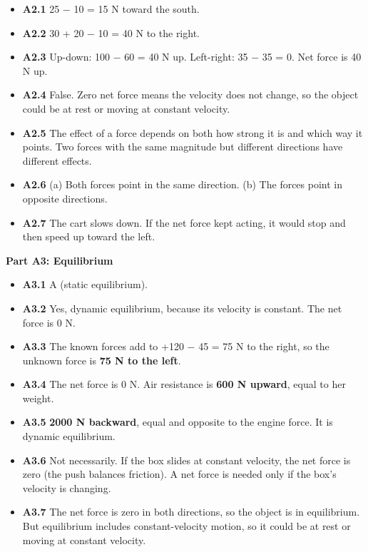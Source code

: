 \documentclass[
]{article}
\providecommand{\tightlist}{%
  \setlength{\itemsep}{0pt}\setlength{\parskip}{0pt}}
\begin{document}
\begin{itemize}
\tightlist
\item
  \textbf{A2.1} 25 − 10 = 15 N toward the south.
\item
  \textbf{A2.2} 30 + 20 − 10 = 40 N to the right.
\item
  \textbf{A2.3} Up-down: 100 − 60 = 40 N up. Left-right: 35 − 35 = 0.
  Net force is 40 N up.
\item
  \textbf{A2.4} False. Zero net force means the velocity does not
  change, so the object could be at rest or moving at constant velocity.
\item
  \textbf{A2.5} The effect of a force depends on both how strong it is
  and which way it points. Two forces with the same magnitude but
  different directions have different effects.
\item
  \textbf{A2.6} (a) Both forces point in the same direction. (b) The
  forces point in opposite directions.
\item
  \textbf{A2.7} The cart slows down. If the net force kept acting, it
  would stop and then speed up toward the left.
\end{itemize}

\textbf{Part A3: Equilibrium}

\begin{itemize}
\tightlist
\item
  \textbf{A3.1} A (static equilibrium).
\item
  \textbf{A3.2} Yes, dynamic equilibrium, because its velocity is
  constant. The net force is 0 N.
\item
  \textbf{A3.3} The known forces add to +120 − 45 = 75 N to the right,
  so the unknown force is \textbf{75 N to the left}.
\item
  \textbf{A3.4} The net force is 0 N. Air resistance is \textbf{600 N
  upward}, equal to her weight.
\item
  \textbf{A3.5} \textbf{2000 N backward}, equal and opposite to the
  engine force. It is dynamic equilibrium.
\item
  \textbf{A3.6} Not necessarily. If the box slides at constant velocity,
  the net force is zero (the push balances friction). A net force is
  needed only if the box's velocity is changing.
\item
  \textbf{A3.7} The net force is zero in both directions, so the object
  is in equilibrium. But equilibrium includes constant-velocity motion,
  so it could be at rest or moving at constant velocity.
\end{itemize}
\end{document}
